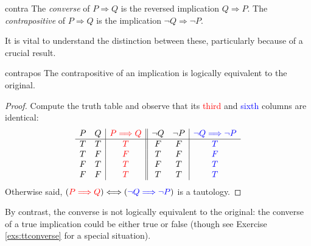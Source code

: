 \goodbreak



\begin{defn}{}{contra}
	The \emph{converse} of $P\Longrightarrow Q$ is the reversed implication $Q\Longrightarrow P$.\smallbreak
	The \emph{contrapositive} of $P\Longrightarrow Q$ is the implication $\neg Q\Longrightarrow\neg P$.
\end{defn}

It is vital to understand the distinction between these, particularly because of a crucial result. %

\begin{thm}{}{contrapos}
	The contrapositive of an implication is logically equivalent to the original.
\end{thm}

\begin{proof}
	Compute the truth table and observe that its \textcolor{red}{third} and \textcolor{blue}{sixth} columns are identical:
	\begin{gather*}
		\begin{array}{cc|c||cc|c}
			P & Q & \textcolor{red}{P\Longrightarrow Q} & \neg Q & \neg P & \textcolor{blue}{\neg Q\Longrightarrow\neg P}\\\hline
			T & T & \textcolor{red}{T} & F & F & \textcolor{blue}{T}\\
			T & F & \textcolor{red}{F} & T & F & \textcolor{blue}{F}\\
			F & T & \textcolor{red}{T} & F & T & \textcolor{blue}{T}\\
			F & F & \textcolor{red}{T} & T & T & \textcolor{blue}{T}
		\end{array}
	\end{gather*}
	Otherwise said, $(\textcolor{red}{P\Longrightarrow Q})\Longleftrightarrow (\textcolor{blue}{\neg Q\Longrightarrow\neg P})$ is a tautology.
\end{proof}

By contrast, the converse is not logically equivalent to the original: the converse of a true implication could be either true or false (though see Exercise \ref{exs:ttconverse} for a special situation).

